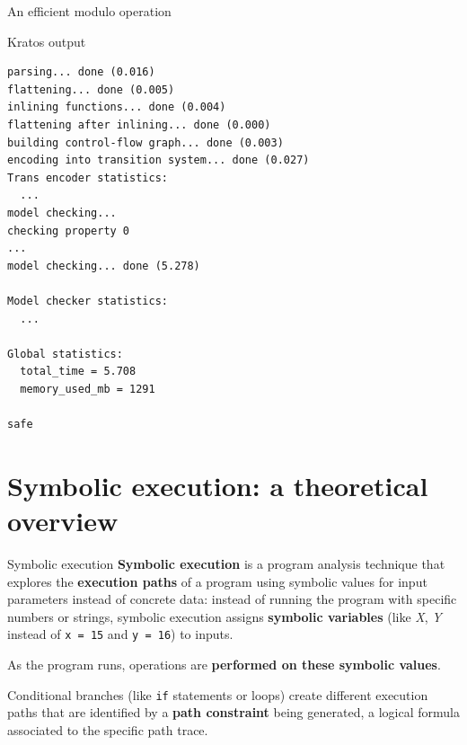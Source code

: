 \documentclass[aspectratio=1610,10.5pt]{beamer} %
\begin{document}
\begin{frame}[fragile]{An efficient modulo operation}
    \begin{block}{Kratos output}
            \begin{verbatim}
parsing... done (0.016)
flattening... done (0.005)
inlining functions... done (0.004)
flattening after inlining... done (0.000)
building control-flow graph... done (0.003)
encoding into transition system... done (0.027)
Trans encoder statistics:
  ...
model checking...
checking property 0
...
model checking... done (5.278)

Model checker statistics:
  ...

Global statistics:
  total_time = 5.708
  memory_used_mb = 1291

safe
            \end{verbatim}
    \end{block}
\end{frame}

\section{Symbolic execution: a theoretical overview}
\begin{frame}{Symbolic execution}
    \textbf{Symbolic execution} is a program analysis technique that explores the \textbf{execution paths} of a program using symbolic values for input parameters instead of concrete data: instead of running the program with specific numbers or strings, symbolic execution assigns \textbf{symbolic variables} (like \textit{X}, \textit{Y} instead of \texttt{x = 15} and \texttt{y = 16}) to inputs.

    \bigskip

    As the program runs, operations are \textbf{performed on these symbolic values}.

    \medskip

    Conditional branches (like \texttt{if} statements or loops) create different execution paths that are identified by a \textbf{path constraint} being generated, a logical formula associated to the specific path trace.
\end{frame}
\end{document}
